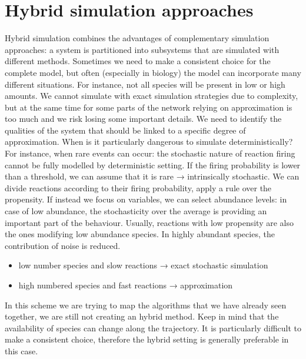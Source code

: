 \graphicspath{{chapters/06/images/}}
\chapter{Hybrid simulation approaches}
Hybrid simulation combines the advantages of complementary simulation approaches: a system is partitioned into subsystems that are simulated with different methods.
Sometimes we need to make a consistent choice for the complete model, but often (especially in biology) the model can incorporate many different situations.
For instance, not all species will be present in low or high amounts.
We cannot simulate with exact simulation strategies due to complexity, but at the same time for some parts of the network relying on approximation is too much and we risk losing some important details.
We need to identify the qualities of the system that should be linked to a specific degree of approximation.
When is it particularly dangerous to simulate deterministically? For instance, when rare events can occur: the stochastic nature of reaction firing cannot be fully modelled by deterministic setting.
If the firing probability is lower than a threshold, we can assume that it is rare → intrinsically stochastic.
We can divide reactions according to their firing probability, apply a rule over the propensity.
If instead we focus on variables, we can select abundance levels: in case of low abundance, the stochasticity over the average is providing an important part of the behaviour.
Usually, reactions with low propensity are also the ones modifying low abundance species.
In highly abundant species, the contribution of noise is reduced.

\begin{itemize}
  \item low number species and slow reactions → exact stochastic simulation
  \item high numbered species and fast reactions → approximation
\end{itemize}

In this scheme we are trying to map the algorithms that we have already seen together, we are still not creating an hybrid method.
Keep in mind that the availability of species can change along the trajectory.
It is particularly difficult to make a consistent choice, therefore the hybrid setting is generally preferable in this case.

